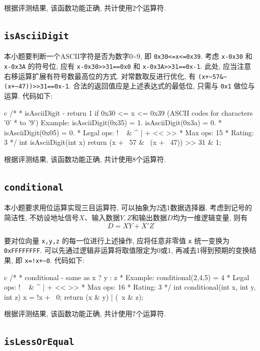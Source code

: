 根据评测结果, 该函数功能正确, 共计使用2个运算符.

\subsection{\texttt{isAsciiDigit}}

本小题要判断一个ASCII字符是否为数字0\textasciitilde9, 即 \verb|0x30<=x<=0x39|. 考虑 \verb|x-0x30| 和 \verb|x-0x3A| 的符号位, 应有 \verb|x-0x30>>31==0x0| 和  \verb|x-0x3A>>31==0x-1|. 此处, 应当注意右移运算扩展有符号数最高位的方式. 对常数取反进行优化, 有 \verb|(x+~57&~(x+~47))>>31==0x-1|. 合法的返回值应是上述表达式的最低位, 只需与 \verb|0x1| 做位与运算. 代码如下:

\begin{code}{c}
/*
 * isAsciiDigit - return 1 if 0x30 <= x <= 0x39 (ASCII codes for characters '0'
 * to '9') Example: isAsciiDigit(0x35) = 1. isAsciiDigit(0x3a) = 0.
 *            isAsciiDigit(0x05) = 0.
 *   Legal ops: ! ~ & ^ | + << >>
 *   Max ops: 15
 *   Rating: 3
 */
int isAsciiDigit(int x) { return (x + ~57 & ~(x + ~47)) >> 31 & 1; }
\end{code}

根据评测结果, 该函数功能正确, 共计使用8个运算符.

\subsection{\texttt{conditional}}

本小题要求用位运算实现三目运算符, 可以抽象为2选1数据选择器. 考虑到记号的简洁性, 不妨设地址信号$X$、输入数据$Y,Z$和输出数据$D$均为一维逻辑变量, 则有
$$D=XY+X'Z$$

要对位向量 \verb|x,y,z| 的每一位进行上述操作, 应将任意非零值 \verb|x| 统一变换为 \verb|0xFFFFFFFF|. 可以先通过逻辑非运算将取值限定为0或1, 再减去1得到预期的变换结果, 即 \verb|x=!x+~0|. 代码如下:

\begin{code}{c}
/*
 * conditional - same as x ? y : z
 *   Example: conditional(2,4,5) = 4
 *   Legal ops: ! ~ & ^ | + << >>
 *   Max ops: 16
 *   Rating: 3
 */
int conditional(int x, int y, int z) {
  x = !x + ~0;
  return (x & y) | (~x & z);
}
\end{code}

根据评测结果, 该函数功能正确, 共计使用7个运算符.

\subsection{\texttt{isLessOrEqual}}

